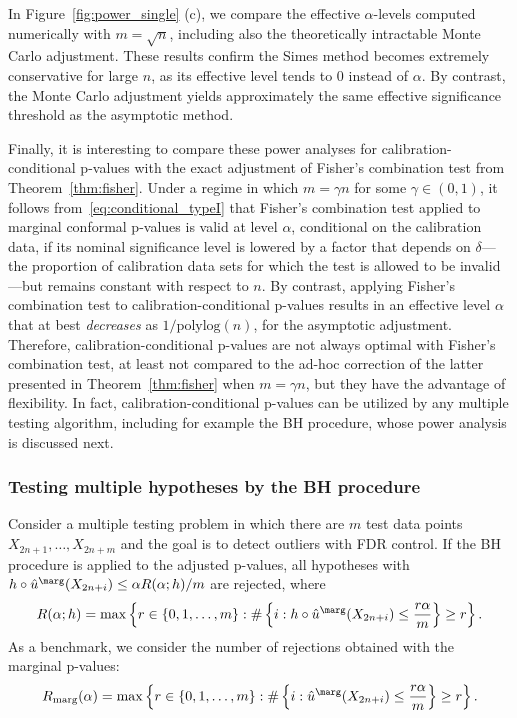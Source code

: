 In Figure~\ref{fig:power_single} (c), we compare the effective $\alpha$-levels computed numerically with $m = \sqrt{n}$, including also the theoretically intractable Monte Carlo adjustment. These results confirm the Simes method becomes extremely conservative for large $n$, as its effective level tends to $0$ instead of $\alpha$. By contrast, the Monte Carlo adjustment yields approximately the same effective significance threshold as the asymptotic method.

Finally, it is interesting to compare these power analyses for calibration-conditional p-values with the exact adjustment of Fisher's combination test from Theorem~\ref{thm:fisher}.
Under a regime in which $m = \gamma n$ for some $\gamma \in (0, 1)$, it follows from~\eqref{eq:conditional_typeI} that Fisher's combination test applied to marginal conformal p-values is valid at level $\alpha$, conditional on the calibration data, if its nominal significance level is lowered by a factor that depends on $\delta$---the proportion of calibration data sets for which the test is allowed to be invalid---but remains constant with respect to $n$. By contrast, applying Fisher's combination test to calibration-conditional p-values results in an effective level $\alpha$ that at best {\em decreases} as $1/\text{polylog}(n)$, for the asymptotic adjustment.
Therefore, calibration-conditional p-values are not always optimal with Fisher's combination test, at least not compared to the ad-hoc correction of the latter presented in Theorem~\ref{thm:fisher} when $m = \gamma n$, but they have the advantage of flexibility. In fact, calibration-conditional p-values can be utilized by any multiple testing algorithm, including for example the BH procedure, whose power analysis is discussed next.

\subsubsection{Testing multiple hypotheses by the BH procedure} \label{sec:power-BH}

Consider a multiple testing problem in which there are $m$ test data points $X_{2n+1}, \ldots, X_{2n+m}$ and the goal is to detect outliers with FDR control. If the BH procedure is applied to the adjusted p-values, all hypotheses with $h\circ \hat{u}^\marg(X_{2n+i})\le \alpha R(\alpha; h) / m$ are rejected, where
\[R(\alpha; h) = \max\left\{r \in \{0,1,\ldots,m\}: \#\left\{i: h\circ \hat{u}^\marg(X_{2n+i})\le \frac{r\alpha}{m}\right\}\ge r\right\}.\]
As a benchmark, we consider the number of rejections obtained with the marginal p-values:
\[R_{\mathrm{marg}}(\alpha) = \max\left\{r \in \{0,1,\ldots,m\}: \#\left\{i: \hat{u}^\marg(X_{2n+i})\le \frac{r\alpha}{m}\right\}\ge r\right\}.\]

